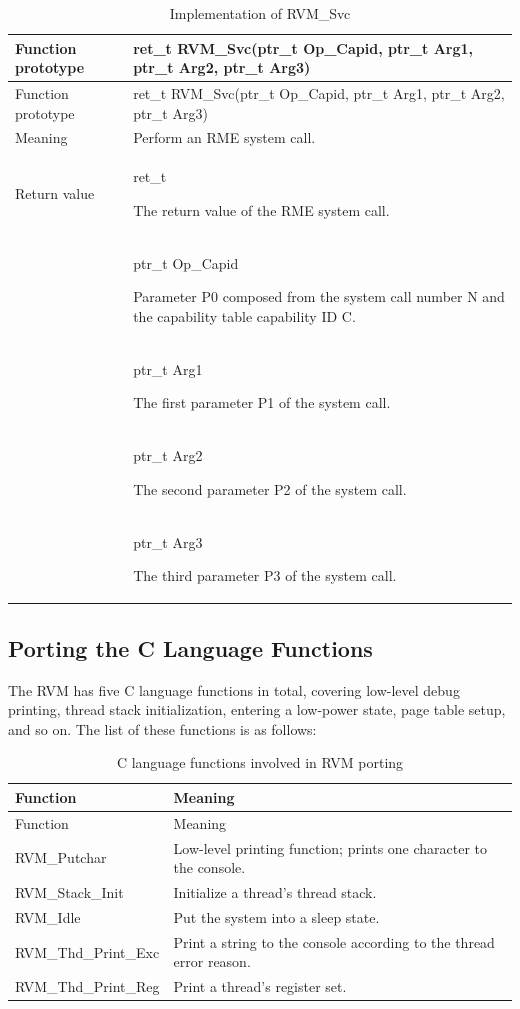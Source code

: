 \begin{xltabular}{\textwidth}{@{}>{\hsize\raggedright\arraybackslash}X>{\hsize\raggedright\arraybackslash}X@{}}
\caption{Implementation of RVM\_\allowbreak{}Svc}\label{tab:8-12}\\
\toprule
Function prototype & ret\_\allowbreak{}t RVM\_\allowbreak{}Svc(ptr\_\allowbreak{}t Op\_\allowbreak{}Capid, ptr\_\allowbreak{}t Arg1, ptr\_\allowbreak{}t Arg2,
ptr\_\allowbreak{}t Arg3)\tabularnewline
\endfirsthead
\toprule
Function prototype & ret\_\allowbreak{}t RVM\_\allowbreak{}Svc(ptr\_\allowbreak{}t Op\_\allowbreak{}Capid, ptr\_\allowbreak{}t Arg1, ptr\_\allowbreak{}t Arg2,
ptr\_\allowbreak{}t Arg3)\tabularnewline
\midrule
\endhead
\bottomrule
\endlastfoot
Meaning & Perform an RME system call.\tabularnewline
Return value\strut
 & ret\_\allowbreak{}t

The return value of the RME system call.\strut
\tabularnewline
{} & ptr\_\allowbreak{}t Op\_\allowbreak{}Capid

Parameter P0 composed from the system call number N and the capability table capability ID C.\strut
\tabularnewline
\strut
 & ptr\_\allowbreak{}t Arg1

The first parameter P1 of the system call.\strut
\tabularnewline
\strut
 & ptr\_\allowbreak{}t Arg2

The second parameter P2 of the system call.\strut
\tabularnewline
\strut
 & ptr\_\allowbreak{}t Arg3

The third parameter P3 of the system call.\strut
\tabularnewline
\end{xltabular}

\subsection{Porting the C Language Functions}\label{subsec:8-2-7}

The RVM has five C language functions in total, covering low-level debug printing, thread stack initialization, entering a low-power state, page table setup, and so on. The list of these functions is as follows:

\begin{xltabular}{\textwidth}{@{}>{\hsize\raggedright\arraybackslash}X>{\hsize\raggedright\arraybackslash}X@{}}
\caption{C language functions involved in RVM porting}\label{tab:8-13}\\
\toprule
Function & Meaning\tabularnewline
\endfirsthead
\toprule
Function & Meaning\tabularnewline
\midrule
\endhead
\bottomrule
\endlastfoot
RVM\_\allowbreak{}Putchar & Low-level printing function; prints one character to the console.\tabularnewline
RVM\_\allowbreak{}Stack\_\allowbreak{}Init & Initialize a thread's thread stack.\tabularnewline
RVM\_\allowbreak{}Idle & Put the system into a sleep state.\tabularnewline
RVM\_\allowbreak{}Thd\_\allowbreak{}Print\_\allowbreak{}Exc &
Print a string to the console according to the thread error reason.\tabularnewline
RVM\_\allowbreak{}Thd\_\allowbreak{}Print\_\allowbreak{}Reg & Print a thread's register set.\tabularnewline
\end{xltabular}

